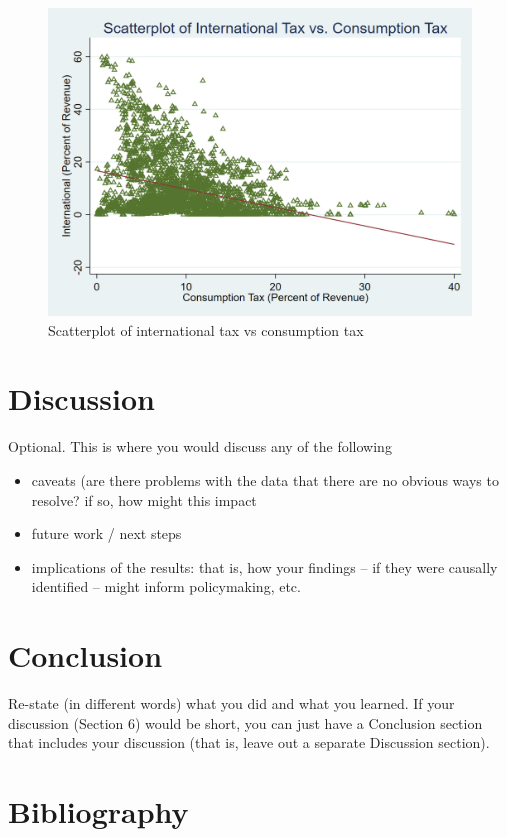 \documentclass[12pt]{article}
\begin{document}
\begin{figure}
    \centering
    \includegraphics[width=0.5\linewidth]{Reproducibility_Package//png_files/Scatterplotintvscons.png}
    \caption{Scatterplot of international tax vs consumption tax}
    \label{fig:enter-label}
\end{figure}

\section{Discussion}
\label{sec:discussion}

Optional. This is where you would discuss any of the following
\begin{itemize}
    \item caveats (are there problems with the data that there are no obvious ways to resolve? if so, how might this impact
    \item future work / next steps
    \item implications of the results: that is, how your findings -- if they were causally identified -- might inform policymaking, etc.
\end{itemize}

\section{Conclusion}
\label{sec:conclusion}

Re-state (in different words) what you did and what you learned. If your discussion (Section 6) would be short, you can just have a Conclusion section that includes your discussion (that is, leave out a separate Discussion section).

\newpage
\section*{Bibliography}
\singlespacing
\setlength\bibsep{0pt}
\end{document}
